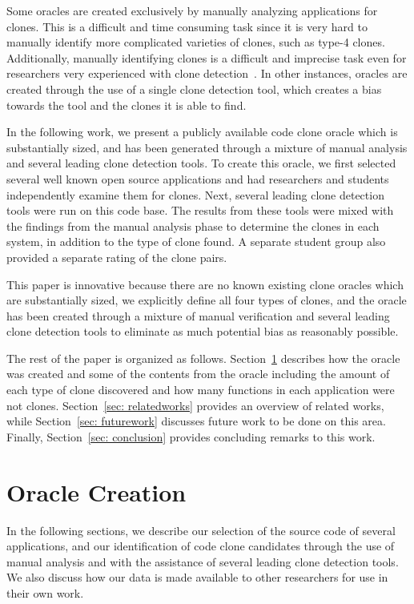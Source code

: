 \documentclass{sig-alternate}
\begin{document}
Some oracles are created exclusively by manually analyzing applications for clones. This is a difficult and time consuming task since it is very hard to manually identify more complicated varieties of clones, such as type-4 clones. Additionally, manually identifying clones is a difficult and imprecise task even for researchers very experienced with clone detection~\cite{Walenstein:2003:PCT:950792.951349}. In other instances, oracles are created through the use of a single clone detection tool, which creates a bias towards the tool and the clones it is able to find.

In the following work, we present a publicly available code clone oracle which is substantially sized, and has been generated through a mixture of manual analysis and several leading clone detection tools. To create this oracle, we first selected several well known open source applications and had researchers and students independently examine them for clones. Next, several leading clone detection tools were run on this code base. The results from these tools were mixed with the findings from the manual analysis phase to determine the clones in each system, in addition to the type of clone found. A separate student group also provided a separate rating of the clone pairs.

This paper is innovative because there are no known existing clone oracles which are substantially sized, we explicitly define all four types of clones, and the oracle has been created through a mixture of manual verification and several leading clone detection tools to eliminate as much potential bias as reasonably possible.

The rest of the paper is organized as follows. Section~\ref{sec: oraclecreation} describes how the oracle was created and some of the contents from the oracle including the amount of each type of clone discovered and how many functions in each application were not clones. Section~\ref{sec: relatedworks} provides an overview of related works, while Section~\ref{sec: futurework} discusses future work to be done on this area. Finally, Section~\ref{sec: conclusion} provides concluding remarks to this work.


\section{Oracle Creation} %
\label{sec: oraclecreation}

In the following sections, we describe our selection of the source code of several applications, and our identification of code clone candidates through the use of manual analysis and with the assistance of several leading clone detection tools. We also discuss how our data is made available to other researchers for use in their own work.
\end{document}
